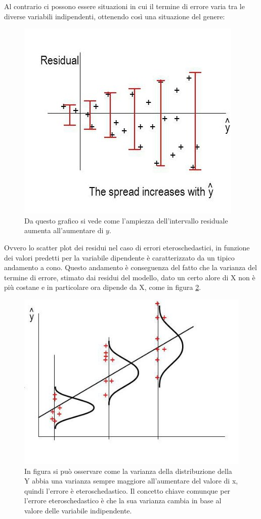 \documentclass[]{article}
\begin{document}
Al contrario ci possono essere situazioni in cui il termine di errore varia tra le diverse variabili indipendenti, ottenendo così una situazione del genere:
\begin{figure}
	\centering
	\includegraphics[scale = 0.5]{Immagini/residui-eteroschedastici.jpg}
	\caption{Da questo grafico si vede come l'ampiezza dell'intervallo residuale aumenta all'aumentare di $y$.}
	\label{fig: residui-eteroschedastici}
\end{figure}
Ovvero lo scatter plot dei residui nel caso di errori eteroschedastici, in funzione dei valori predetti per la variabile dipendente è caratterizzato da un tipico andamento a cono. Questo andamento è conseguenza del fatto che la varianza del termine di errore, stimato dai residui del modello, dato un certo alore di X non è più costane e in particolare ora dipende da X, come in figura \ref{fig: regressione-eteroschedastica}.
\begin{figure}[H]
	\centering
	\includegraphics[scale = 0.5]{Immagini/regressione-eteroschedastica.jpg}
	\caption{In figura si può osservare come la varianza della distribuzione della Y abbia una varianza sempre maggiore all'aumentare del valore di x, quindi l'errore è eteroschedastico. Il concetto chiave comunque per l'errore eteroschedastico è che la sua varianza cambia in base al valore delle variabile indipendente.}
	\label{fig: regressione-eteroschedastica}
\end{figure}
\end{document}
